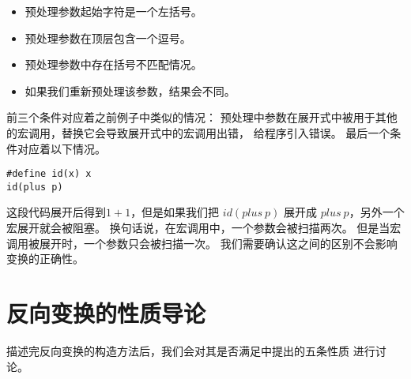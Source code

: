 \begin{itemize}
\item 预处理参数起始字符是一个左括号。
\item 预处理参数在顶层包含一个逗号。
\item 预处理参数中存在括号不匹配情况。
\item 如果我们重新预处理该参数，结果会不同。
\end{itemize}
前三个条件对应着之前例子中类似的情况：
预处理中参数在展开式中被用于其他的宏调用，替换它会导致展开式中的宏调用出错，
给程序引入错误。
最后一个条件对应着以下情况。
\begin{lstlisting}
#define id(x) x
id(plus p)
\end{lstlisting}
这段代码展开后得到$1+1$，但是如果我们把 $id(plus\ p)$
展开成  $plus\ p$，另外一个宏展开就会被阻塞。
换句话说，在宏调用中，一个参数会被扫描两次。
但是当宏调用被展开时，一个参数只会被扫描一次。
我们需要确认这之间的区别不会影响变换的正确性。

\section{反向变换的性质导论}\label{sec:correctness}
描述完反向变换的构造方法后，我们会对其是否满足中提出的五条性质
进行讨论。

